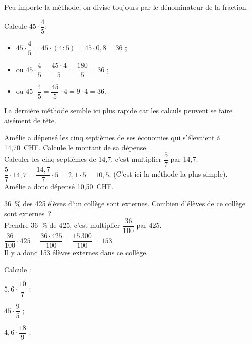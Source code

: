 \begin{methode*1}

\begin{remarque}
Peu importe la méthode, on divise toujours par le dénominateur de la fraction.
 \end{remarque}

\begin{exemple*1}
Calcule $45 \cdot \dfrac{4}{5}$: \\[1em]
\begin{itemize}
 \item $45 \cdot \dfrac{4}{5} = 45 \cdot (4 : 5) = 45 \cdot 0,8 = 36$ ;
 \item ou $45 \cdot \dfrac{4}{5} = \dfrac{45 \cdot 4}{5} = \dfrac{180}{5} = 36$ ;
 \item ou $45 \cdot \dfrac{4}{5} = \dfrac{45}{5} \cdot 4 = 9 \cdot 4 = 36$.
 \end{itemize}
 \end{exemple*1}

\begin{remarque}
La dernière méthode semble ici plus rapide car les calculs peuvent se faire aisément de tête.
 \end{remarque}
 
 
\begin{exemple*1}
Amélie a dépensé les cinq septièmes de ses économies qui s'élevaient à 14,70 CHF. Calcule le montant de sa dépense. \\[1em]
Calculer les cinq septièmes de 14,7, c'est multiplier $\dfrac{5}{7}$ par 14,7. \\[0.5em]
$\dfrac{5}{7} \cdot 14,7 = \dfrac{14,7}{7} \cdot 5 = 2,1 \cdot 5 = 10,5$. (C'est ici la méthode la plus simple).\\[0.5em]
Amélie a donc dépensé 10,50 CHF.
 \end{exemple*1}
 
 
\begin{exemple*1}
36 \% des 425 élèves d'un collège sont externes. Combien d'élèves de ce collège sont externes ? \\[1em]
Prendre 36 \% de 425, c'est multiplier $\dfrac{36}{100}$ par 425.\\[0.5em]
$\dfrac{36}{100} \cdot 425 = \dfrac{36 \cdot 425}{100} = \dfrac{15\,300}{100} = 153$ \\[0.5em]
Il y a donc 153 élèves externes dans ce collège.
 \end{exemple*1}
 
  \exercice
Calcule :
\begin{colenumerate}{3}
 \item $5,6 \cdot \dfrac{10}{7}$ ;
 \item $45 \cdot \dfrac{9}{5}$ ;
 \item $4,6 \cdot \dfrac{18}{9}$ ; 
 \end{colenumerate}


\end{methode*1}
